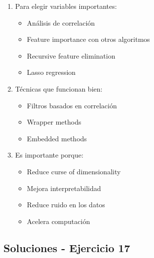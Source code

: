\documentclass[12pt]{article}
\begin{document}
\begin{enumerate}
    \item Para elegir variables importantes:
    \begin{itemize}
        \item Análisis de correlación
        \item Feature importance con otros algoritmos
        \item Recursive feature elimination
        \item Lasso regression
    \end{itemize}
    \item Técnicas que funcionan bien:
    \begin{itemize}
        \item Filtros basados en correlación
        \item Wrapper methods
        \item Embedded methods
    \end{itemize}
    \item Es importante porque:
    \begin{itemize}
        \item Reduce curse of dimensionality
        \item Mejora interpretabilidad
        \item Reduce ruido en los datos
        \item Acelera computación
    \end{itemize}
\end{enumerate}

\subsection{Soluciones - Ejercicio 17}
\end{document}
